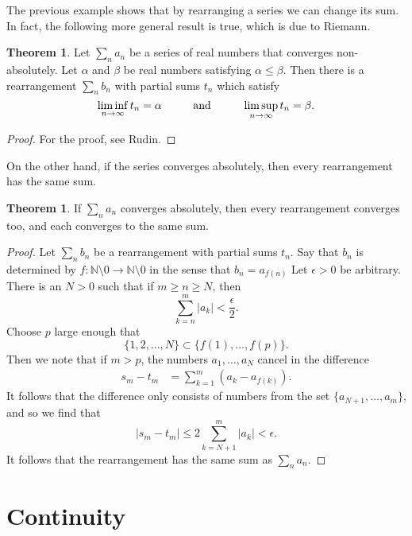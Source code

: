 \documentclass[12pt]{article}
\theoremstyle{definition}
\theoremstyle{theorem}
\newtheorem{theorem}[definition]{Theorem}
\begin{document}
The previous example shows that by rearranging a series we can change its sum. In fact, the following more general result is true, which is due to Riemann. 


\begin{theorem}
Let $\sum_n a_n$ be a series of real numbers that converges non-absolutely. Let $\alpha$ and $\beta$ be real numbers satisfying $\alpha \leqslant \beta$. Then there is a rearrangement $\sum_n b_n$ with partial sums $t_n$ which satisfy 
\[
\liminf_{n \to \infty} t_n = \alpha \hspace{10mm} \text{and} \hspace{10mm} \limsup_{n \to \infty} t_n = \beta.
\]
\end{theorem}

\begin{proof}
For the proof, see Rudin. 
\end{proof}

On the other hand, if the series converges absolutely, then every rearrangement has the same sum. 

\begin{theorem}
If $\sum_n a_n$ converges absolutely, then every rearrangement converges too, and each converges to the same sum. 
\end{theorem}

\begin{proof}
Let $\sum_n b_n$ be a rearrangement with partial sums $t_n$. Say that $b_n$ is determined by $f : \mathbb{N} \setminus 0 \to \mathbb{N} \setminus 0$ in the sense that $b_n = a_{f(n)}$  Let $\epsilon > 0$ be arbitrary. There is an $N > 0$ such that if $m \geqslant n \geqslant N$, then 
\[
\sum_{k=n}^m |a_k| < \frac{\epsilon}{2}.
\]
Choose $p$ large enough that 
\[
\{1, 2, \ldots, N\} \subset \{f(1), \ldots, f(p)\}. 
\]
Then we note that if $m >p$, the numbers $a_1, \ldots, a_N$ cancel in the difference 
\begin{align*}
s_m - t_m &= \sum_{k=1}^m (a_k - a_{f(k)}). 
\end{align*}
It follows that the difference only consists of numbers from the set $\{a_{N+1}, \ldots, a_m\}$, and so we find that 
\[
|s_m - t_m| \leqslant 2 \sum_{k=N+1}^m |a_k| < \epsilon.
\]
It follows that the rearrangement has the same sum as $\sum_n a_n$.  
\end{proof}

\section{Continuity}
\end{document}
